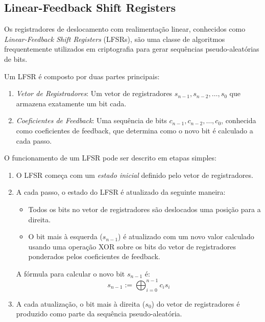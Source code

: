 \subsection{Linear-Feedback Shift Registers}
\label{sec:lfsr}

Os registradores de deslocamento com realimentação linear, conhecidos como \textit{Linear-Feedback Shift Registers} (LFSRs), são uma classe de algoritmos frequentemente utilizados em criptografia para gerar sequências pseudo-aleatórias de bits.

Um LFSR é composto por duas partes principais:
\begin{enumerate}
    \item {\em Vetor de Registradores}: Um vetor de registradores \(s_{n-1}, s_{n-2}, \dots, s_0\) que armazena exatamente um bit cada.
    \item {\em Coeficientes de Feedback}: Uma sequência de bits \(c_{n-1}, c_{n-2}, \dots, c_0\), conhecida como coeficientes de feedback, que determina como o novo bit é calculado a cada passo.
\end{enumerate}

O funcionamento de um LFSR pode ser descrito em etapas simples:

\begin{enumerate}
    \item O LFSR começa com um {\em estado inicial} definido pelo vetor de registradores.
    \item A cada passo, o estado do LFSR é atualizado da seguinte maneira:
    \begin{itemize}
        \item Todos os bits no vetor de registradores são deslocados uma posição para a direita.
        \item O bit mais à esquerda ($s_{n-1}$) é atualizado com um novo valor calculado usando uma operação XOR sobre os bits do vetor de registradores ponderados pelos coeficientes de feedback.
    \end{itemize}
    A fórmula para calcular o novo bit $s_{n-1}$ é:
    \begin{displaymath}
    s_{n-1} := \bigoplus_{i=0}^{n-1} c_i s_i
    \end{displaymath}

    \item A cada atualização, o bit mais à direita ($s_0$) do vetor de registradores é produzido como parte da sequência pseudo-aleatória.
\end{enumerate}

